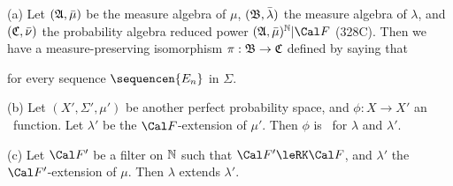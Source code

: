 (a) Let $(\frak A,\bar\mu)$ be the measure algebra of $\mu$,
$(\frak B,\bar\lambda)$ the measure algebra of $\lambda$, and
$(\frak C,\bar\nu)$ the probability algebra reduced power
$(\frak A,\bar\mu)^{\Bbb N}|\Cal F$
(328C).  Then we have a
measure-preserving isomorphism $\pi:\frak B\to\frak C$ defined by saying
that


\noindent for every sequence $\sequencen{E_n}$ in $\Sigma$.

(b) Let $(X',\Sigma',\mu')$ be another
perfect probability space, and $\phi:X\to X'$ an \imp\ function.
Let $\lambda'$ be the $\Cal F$-extension of $\mu'$.
Then $\phi$ is \imp\ for $\lambda$ and $\lambda'$.

(c) Let $\Cal F'$ be a filter on $\Bbb N$ such that $\Cal F'\leRK\Cal F$,
and $\lambda'$ the
$\Cal F'$-extension of $\mu$.   Then $\lambda$ extends $\lambda'$.

